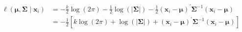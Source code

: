 \begin{equation}
    \begin{split}
        \ell
        \left(
        \boldsymbol{\mu},
        \boldsymbol{\Sigma}
        \mid
    \mathbf{x}_{i}
    \right)
    &=
    -
    \frac{k}{2}
    \log
    \left(
    2
    \pi
    \right)
    -
    \frac{1}{2}
    \log
    \left(
    \left|
    \boldsymbol{\Sigma}
    \right|
    \right)
    -
    \frac{1}{2}
    \left(
      \mathbf{x}_{i}
      -
      \boldsymbol{\mu}
    \right)^{\prime}
    \boldsymbol{\Sigma}^{-1}
    \left(
      \mathbf{x}_{i}
      -
      \boldsymbol{\mu}
    \right) \\
    &=
    -
    \frac{1}{2}
    \left[
    k
    \log
    \left(
    2
    \pi
    \right)
    +
    \log
    \left(
    \left|
    \boldsymbol{\Sigma}
    \right|
    \right)
    +
    \left(
      \mathbf{x}_{i}
      -
      \boldsymbol{\mu}
    \right)^{\prime}
    \boldsymbol{\Sigma}^{-1}
    \left(
      \mathbf{x}_{i}
      -
      \boldsymbol{\mu}
    \right)
    \right]
    \end{split}
    \label{eq:multiNorm-mvn-loglikelihood-i}
\end{equation}

